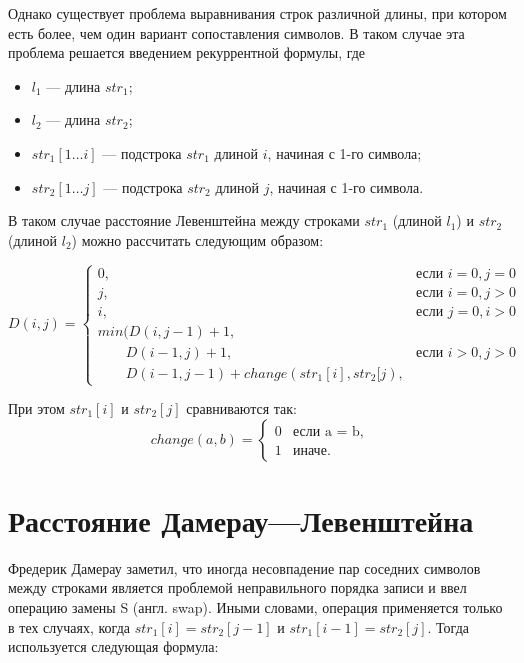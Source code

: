 Однако существует проблема выравнивания строк различной длины, при котором есть более, чем один вариант сопоставления символов. 
В таком случае эта проблема решается введением рекуррентной формулы, где

\begin{itemize}
	\item $l_{1}$ --- длина $str_{1}$;
	\item $l_{2}$ --- длина $str_{2}$;
	\item $str_{1}[1 \ldots i]$ --- подстрока $str_{1}$ длиной $i$, начиная с 1-го символа;
	\item $str_{2}[1 \ldots j]$ --- подстрока $str_{2}$ длиной $j$, начиная с 1-го символа.
\end{itemize}

В таком случае расстояние Левенштейна между строками $str_{1}$ (длиной $l_{1}$) и $str_{2}$ (длиной $l_{2}$) можно рассчитать следующим образом:

\begin{footnotesize}
	\begin{equation}
		\label{equation:lev}
		D(i, j) = \begin{cases}
			0, & \textrm{$\mbox{если }i = 0, j = 0$}\\
			j, & \textrm{$\mbox{если }i = 0, j > 0$}\\
			i, & \textrm{$\mbox{если }j = 0, i > 0$}\\
			min(D(i, j - 1)+1,\\
			\qquad D(i - 1, j) + 1, &\textrm{$\mbox{если }i > 0, j > 0$}\\
			\qquad D(i - 1, j - 1) + change(str_{1}[i],str_{2}[j),
		\end{cases}
	\end{equation}
\end{footnotesize}

При этом $str_{1}[i]$ и $str_{2}[j]$ сравниваются так:
\begin{equation}
	\label{equation:change}
	change(a, b) = \begin{cases}
		0 &\text{если a = b,}\\
		1 &\text{иначе.}
	\end{cases}
\end{equation}

\section{Расстояние Дамерау---Левенштейна}

Фредерик Дамерау заметил, что иногда несовпадение пар соседних символов между строками является проблемой неправильного порядка записи и ввел операцию замены S (англ. swap). 
Иными словами, операция применяется только в тех случаях, когда $str_{1}[i] = str_{2}[j - 1]$ и $str_{1}[i - 1] = str_{2}[j]$. Тогда используется следующая формула:

